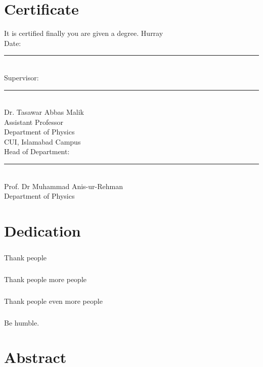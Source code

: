 \documentclass[12pt,two side]{report}
\begin{document}
\chapter*{Certificate}
\justify
It is certified finally you are given a degree. Hurray\vspace{2cm}\\
\flushleft
Date: \hspace{0.2cm}\noindent\rule{4cm}{0.4pt} \vspace{1.5cm}\\
Supervisor:\vspace{1cm}\\
    \noindent\rule{8cm}{0.4pt}\\
	Dr. Tasawar Abbas Malik\\
	Assistant Professor\\
	Department of Physics\\
	CUI, Islamabad Campus \vspace{1cm}\\

Head of Department: \vspace{1cm} \\
    \noindent\rule{8cm}{0.4pt}\\
	Prof. Dr Muhammad Anis-ur-Rehman\\
	Department of Physics
\noindent
\chapter*{Dedication}
\paragraph{}
Thank people 
\paragraph{}
Thank people  more people
\paragraph{}
Thank people even more people
\paragraph{}
Be humble.
\noindent
\chapter*{Abstract}
\justify
\lipsum[1-2]
\end{document}

